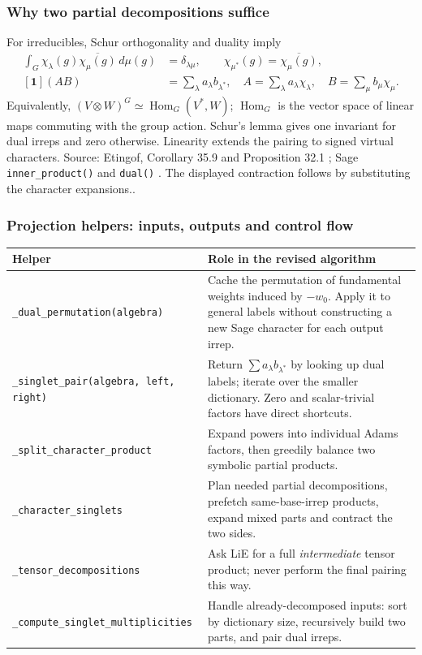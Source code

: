 \documentclass[11pt,a4paper]{article}
\numberwithin{equation}{section}
\newcommand{\code}[1]{{\small\nolinkurl{#1}}}
\newcommand{\src}[1]{{\small\color{muted}Source: #1.}\par}
\begin{document}
\subsubsection{Why two partial decompositions suffice}
For irreducibles, Schur orthogonality and duality imply
\begin{align*}
 \int_G\chi_\lambda(g)\overline{\chi_\mu(g)}\,d\mu(g)&=\delta_{\lambda\mu},\qquad
 \chi_{\mu^*}(g)=\overline{\chi_\mu(g)},\\
 [\mathbf1](AB)&=\sum_\lambda a_\lambda b_{\lambda^*},\quad
 A=\sum_\lambda a_\lambda\chi_\lambda,\quad B=\sum_\mu b_\mu\chi_\mu.
\end{align*}
Equivalently, $(V\otimes W)^G\simeq\operatorname{Hom}_G(V^*,W)$;
$\operatorname{Hom}_G$ is the vector space of linear maps commuting with the group
action. Schur's lemma gives one invariant for dual irreps and zero otherwise.
Linearity extends the pairing to signed virtual characters.
\src{Etingof, Corollary 35.9 and Proposition 32.1 \cite{etingof};
Sage \code{inner_product()} and \code{dual()} \cite{sage-chars}. The displayed
contraction follows by substituting the character expansions.}

\clearpage
\subsubsection{Projection helpers: inputs, outputs and control flow}
\begin{tabularx}{\textwidth}{@{}p{66mm}Y@{}}
\toprule Helper & Role in the revised algorithm\\\midrule
\code{_dual_permutation(algebra)} & Cache the permutation of fundamental weights
induced by $-w_0$. Apply it to general labels without constructing a new Sage
character for each output irrep.\\
\code{_singlet_pair(algebra, left, right)} & Return
$\sum a_\lambda b_{\lambda^*}$ by looking up dual labels; iterate over the
smaller dictionary. Zero and scalar-trivial factors have direct shortcuts.\\
\code{_split_character_product} & Expand powers into individual Adams factors,
then greedily balance two symbolic partial products.\\
\code{_character_singlets} & Plan needed partial decompositions, prefetch
same-base-irrep products, expand mixed parts and contract the two sides.\\
\code{_tensor_decompositions} & Ask LiE for a full \emph{intermediate} tensor
product; never perform the final pairing this way.\\
\code{_compute_singlet_multiplicities} & Handle already-decomposed inputs:
sort by dictionary size, recursively build two parts, and pair dual irreps.\\\bottomrule
\end{tabularx}
\end{document}
